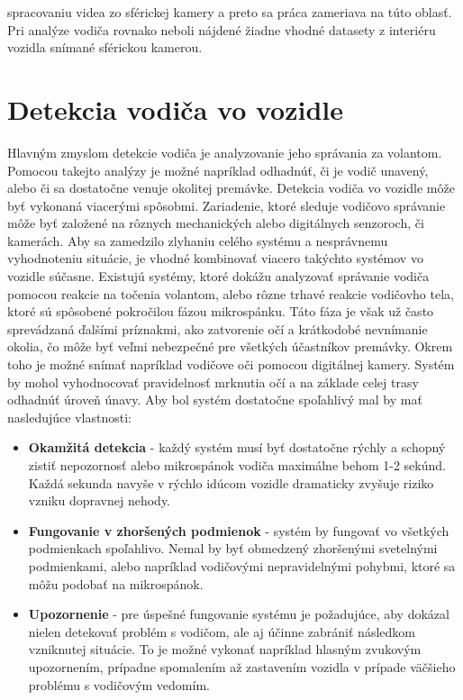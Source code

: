 \documentclass[slovak,master,dept460,male,cpp,cpdeclaration]{diploma}
\begin{document}
spracovaniu videa zo sférickej kamery a preto sa práca zameriava na túto oblasť. Pri analýze vodiča rovnako neboli nájdené žiadne vhodné datasety z interiéru vozidla snímané sférickou kamerou.

\newpage
\section{Detekcia vodiča vo vozidle}
\label{sec:Pose detection}
Hlavným zmyslom detekcie vodiča je analyzovanie jeho správania za volantom.  Pomocou takejto analýzy je možné napríklad odhadnúť, či je vodič unavený, alebo či sa dostatočne venuje okolitej premávke. Detekcia vodiča vo vozidle môže byť vykonaná viacerými spôsobmi. Zariadenie, ktoré sleduje vodičovo správanie môže byť založené na rôznych mechanických alebo digitálnych senzoroch, či kamerách. Aby sa zamedzilo zlyhaniu celého systému a nesprávnemu vyhodnoteniu situácie, je vhodné kombinovať viacero takýchto systémov vo vozidle súčasne. Existujú systémy, ktoré dokážu analyzovať správanie vodiča pomocou reakcie na točenia volantom, alebo rôzne trhavé reakcie vodičovho tela, ktoré sú spôsobené pokročilou fázou mikrospánku. Táto fáza je však už často sprevádzaná ďalšími príznakmi, ako zatvorenie očí a  krátkodobé nevnímanie okolia, čo môže byť veľmi nebezpečné pre všetkých účastníkov premávky.  Okrem toho je možné snímať napríklad  vodičove oči pomocou digitálnej kamery. Systém by mohol vyhodnocovať  pravidelnosť mrknutia očí a na základe celej trasy odhadnúť úroveň únavy. Aby bol systém dostatočne spoľahlivý mal by mať nasledujúce vlastnosti:

\begin{itemize}
\item \textbf{Okamžitá detekcia} - každý systém musí byť dostatočne rýchly a schopný zistiť nepozornosť alebo mikrospánok vodiča maximálne behom 1-2 sekúnd. Každá sekunda navyše v rýchlo idúcom vozidle dramaticky zvyšuje riziko vzniku dopravnej nehody.
\item \textbf{Fungovanie v zhoršených podmienok} - systém by  fungovať vo všetkých podmienkach  spoľahlivo. Nemal by byť obmedzený zhoršenými svetelnými podmienkami, alebo napríklad vodičovými nepravidelnými pohybmi, ktoré sa môžu podobať na mikrospánok.
\item \textbf{Upozornenie} - pre úspešné fungovanie systému je požadujúce, aby dokázal nielen detekovať problém s vodičom, ale aj účinne zabrániť následkom vzniknutej situácie. To je možné vykonať napríklad hlasným zvukovým upozornením, prípadne spomalením až zastavením vozidla v prípade väčšieho problému s vodičovým vedomím. 
\end{itemize}
\end{document}
